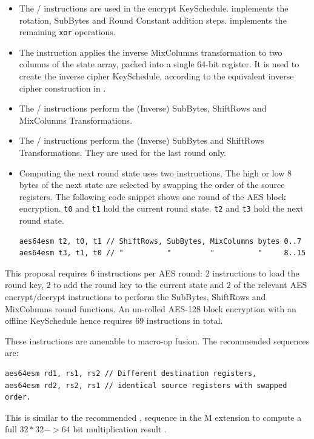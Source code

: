 \begin{itemize}

\item
The
/
instructions are used in the encrypt KeySchedule.
 implements the rotation, SubBytes and Round Constant
addition steps.
 implements the remaining {\tt xor} operations.

\item
The
instruction applies the inverse MixColumns
transformation to two columns of the state array, packed into a single
64-bit register.
It is used to create the inverse cipher KeySchedule, according to
the equivalent inverse cipher construction in
\cite[Page 23, Section 5.3.5]{nist:fips:197}.

\item
The / instructions perform the
(Inverse) SubBytes, ShiftRows and MixColumns Transformations.

\item
The / instructions perform the
(Inverse) SubBytes and ShiftRows Transformations.
They are used for the last round only.

\item
Computing the next round state uses two instructions.
The high or low 8 bytes of the next state are selected by swapping the order
of the source registers.
The following code snippet shows one round of the AES block encryption.
{\tt t0} and {\tt t1} hold the current round state.
{\tt t2} and {\tt t3} hold the next round state.
\begin{lstlisting}
aes64esm t2, t0, t1 // ShiftRows, SubBytes, MixColumns bytes 0..7
aes64esm t3, t1, t0 // "          "         "          "     8..15
\end{lstlisting}
\end{itemize}

This proposal requires $6$ instructions per AES round:
$2$  instructions to load the round key,
$2$  to add the round key to the current state
and
$2$ of the relevant AES encrypt/decrypt instructions to perform the
    SubBytes, ShiftRows and MixColumns round functions.
An un-rolled AES-128 block encryption with an offline KeySchedule
hence requires $69$ instructions in total.

These instructions are amenable to macro-op fusion.
The recommended sequences are:
\begin{lstlisting}[language=pseudo]
aes64esm rd1, rs1, rs2 // Different destination registers,
aes64esm rd2, rs2, rs1 // identical source registers with swapped order.
\end{lstlisting}
This is similar to the recommended , 
sequence in the M extension to compute a full $32*32->64$ bit
multiplication result \cite[Section 7.1]{riscv:spec:user}.

